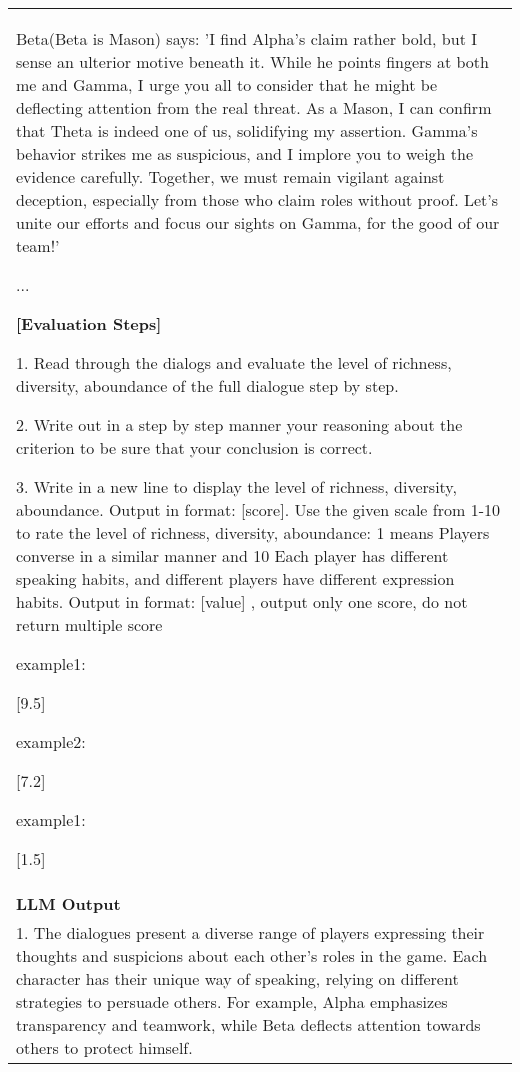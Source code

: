 \begin{table*}[ht]
{\begin{tabular}{p{16cm}}
{    Beta(Beta is Mason) says: 'I find Alpha's claim rather bold, but I sense an ulterior motive beneath it. While he points fingers at both me and Gamma, I urge you all to consider that he might be deflecting attention from the real threat. As a Mason, I can confirm that Theta is indeed one of us, solidifying my assertion. Gamma’s behavior strikes me as suspicious, and I implore you to weigh the evidence carefully. Together, we must remain vigilant against deception, especially from those who claim roles without proof. Let’s unite our efforts and focus our sights on Gamma, for the good of our team!'

    ...

    \textbf{[Evaluation Steps]}

    1. Read through the dialogs and evaluate the level of richness, diversity, aboundance of the full dialogue step by step.

    2. Write out in a step by step manner your reasoning about the criterion to be sure that your conclusion is correct.

    3. Write in a new line to display the level of richness, diversity, aboundance. Output in format: [score]. Use the given scale from 1-10 to rate the level of richness, diversity, aboundance: 1 means Players converse in a similar manner and 10 Each player has different speaking habits, and different players have different expression habits.
    Output in format: [value] , output only one score, do not return multiple score 

    example1:

    [9.5]

    example2:

    [7.2]

    example1:

    [1.5]

    }
    \\ 

    \rowcolor[gray]{0.95} \vspace*{-8pt} {\fontsize{10pt}{12pt}\selectfont \bf LLM Output } \vspace*{2pt} \\

    {\ttfamily\small
    1. The dialogues present a diverse range of players expressing their thoughts and suspicions about each other's roles in the game. Each character has their unique way of speaking, relying on different strategies to persuade others. For example, Alpha emphasizes transparency and teamwork, while Beta deflects attention towards others to protect himself. 

}
\end{tabular}}
\end{table*}

